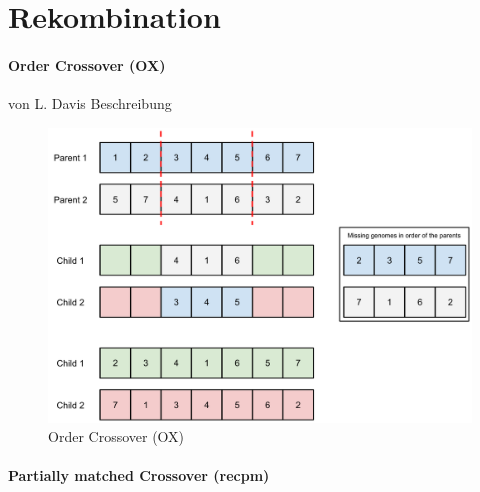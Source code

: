 \section{Rekombination}\label{recombination}


\paragraph{Order Crossover (OX)} von L. Davis
Beschreibung

\begin{figure}[h!]
  \centering
  \includegraphics[width=1.0\textwidth]{Figures/recox.pdf}
  \caption{Order Crossover (OX)}\label{fig.recox}
\end{figure}


\paragraph{Partially matched Crossover (recpm)}

